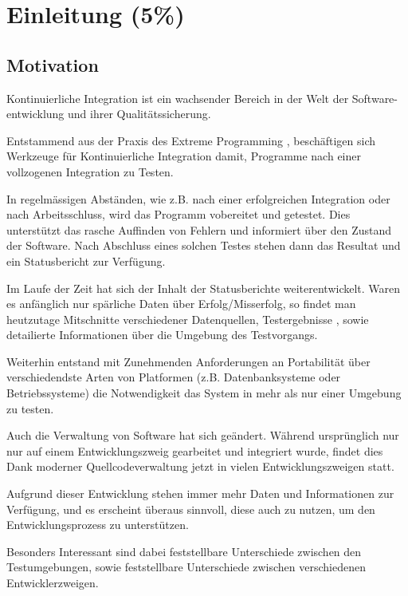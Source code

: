 \chapter{Einleitung (5\%) }

\section{Motivation}

Kontinuierliche Integration ist ein wachsender Bereich
in der Welt der Software-entwicklung und ihrer Qualit\"atssicherung.

Entstammend aus der Praxis des Extreme Programming
\cite{xp:explained, folwer:xp},
besch\"aftigen sich Werkzeuge f\"ur Kontinuierliche Integration damit,
Programme nach einer vollzogenen Integration zu Testen.

In regelm\"assigen Abst\"anden, wie z.B. nach einer erfolgreichen Integration oder nach Arbeitsschluss,
wird das Programm vobereitet und getestet.
Dies unterst\"utzt das rasche Auffinden von Fehlern
und informiert \"uber den Zustand der Software.
Nach Abschluss eines solchen Testes stehen dann das Resultat
und ein Statusbericht zur Verf\"ugung.

Im Laufe der Zeit hat sich der Inhalt der Statusberichte weiterentwickelt.
Waren es anf\"anglich nur sp\"arliche Daten \"uber Erfolg/Misserfolg,
so findet man heutzutage Mitschnitte verschiedener Datenquellen, Testergebnisse
\cite{jenkins:junitxml}, sowie detailierte Informationen \"uber die Umgebung des Testvorgangs.

Weiterhin entstand mit Zunehmenden Anforderungen an Portabilit\"at \"uber
verschiedendste Arten von Platformen (z.B. Datenbanksysteme oder Betriebssysteme)
die Notwendigkeit das System in mehr als nur einer Umgebung zu testen.

Auch die Verwaltung von Software hat sich ge\"andert.
W\"ahrend urspr\"unglich nur nur auf einem Entwicklungszweig gearbeitet und integriert wurde,
findet dies Dank moderner Quellcodeverwaltung jetzt in vielen Entwicklungszweigen statt.
\cite{dvcs:vorteile, dvcs:entwicklungsmodelle}

Aufgrund dieser Entwicklung stehen immer mehr Daten und Informationen zur Verf\"ugung,
und es erscheint \"uberaus sinnvoll, diese auch zu nutzen, um den Entwicklungsprozess zu unterst\"utzen.

Besonders Interessant sind dabei feststellbare Unterschiede zwischen den Testumgebungen,
sowie feststellbare Unterschiede zwischen verschiedenen Entwicklerzweigen.

